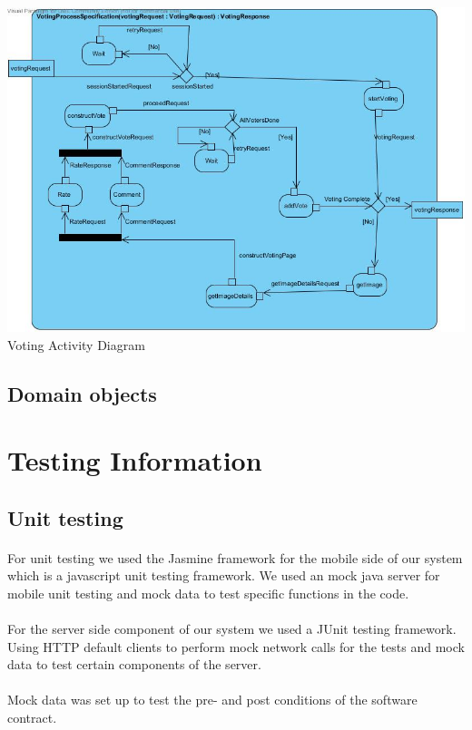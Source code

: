 \documentclass[10pt,a4paper]{article}
\begin{document}
\begin{center}
\advance\leftskip-2cm
\includegraphics[width=170mm]{Pictures/VotingActivityDiagram.jpg} 
Voting Activity Diagram 
\end{center}

\subsection{Domain objects}
\section{Testing Information}
\subsection{Unit testing}
\paragraph{}For unit testing we used the Jasmine framework for the mobile side of our system which is a javascript unit testing framework. We used an mock java server for mobile unit testing and mock data to test specific functions in the code.
\paragraph{} For the server side component of our system we used a JUnit testing framework. Using HTTP default clients to perform mock network calls for the tests and mock data to test certain components of the server.
\paragraph{}Mock data was set up to test the pre- and post conditions of the software contract.
\end{document}
